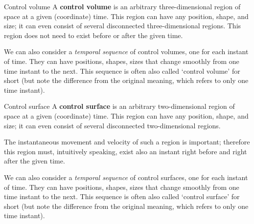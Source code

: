 \documentclass[a4paper,12pt,%
onecolumn,oneside,titlepage,%
british%
]{memoir}
\renewcommand*{\|}[1][]{\nonscript\:#1\vert\nonscript\:\mathopen{}}
\begin{document}
\begin{definition}{Control volume}
  A \textbf{control volume} is an arbitrary three-dimensional region of space at a given (coordinate) time. This region can have any position, shape, and size; it can even consist of several disconnected three-dimensional regions. This region does not need to exist before or after the given time.

  \smallskip

  We can also consider a \emph{temporal sequence} of control volumes, one for each instant of time. They can have positions, shapes, sizes that change smoothly from one time instant to the next. This sequence is often also called \enquote*{control volume} for short (but note the difference from the original meaning, which refers to only one time instant).
\end{definition}
\begin{definition}{Control surface}
  A \textbf{control surface} is an arbitrary two-dimensional region of space at a given (coordinate) time. This region can have any position, shape, and size; it can even consist of several disconnected two-dimensional regions.

  \smallskip

  The instantaneous movement and velocity of such a region is important; therefore this region must, intuitively speaking, exist also an instant right before and right after the given time.

  \smallskip

  We can also consider a \emph{temporal sequence} of control surfaces, one for each instant of time. They can have positions, shapes, sizes that change smoothly from one time instant to the next. This sequence is often also called \enquote*{control surface} for short (but note the difference from the original meaning, which refers to only one time instant).
\end{definition}
\end{document}
